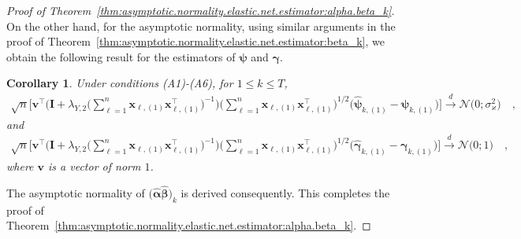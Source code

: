 \documentclass[
  12pt]{article}
\newtheorem{corollary}[thm]{Corollary}
\def\X{\mathbf{x}}
\begin{document}
\begin{proof}[Proof of Theorem~\ref{thm:asymptotic.normality.elastic.net.estimator:alpha.beta_k}]
	On the other hand, for the asymptotic normality, using similar arguments in the proof of Theorem~\ref{thm:asymptotic.normality.elastic.net.estimator:beta_k}, we obtain the following result for the estimators of $\bm{\psi}$ and $\bm{\gamma}$.
	\begin{corollary}  
		\label{thm:asymptotic.normality.elastic.net.estimator:theta_k}
		Under conditions \textrm{(A1)-(A6)}, for $1 \leq k \leq T$,  %
		\begin{align*}
			\sqrt{n}  \Big[   \mathbf{v}^{\top}  \Big( \mathbf{I} +  \lambda_{Y,2} \big( \sum_{\ell = 1}^{n}   \X_{\ell , (1)} \X_{\ell , (1)}^{\top} \big)^{-1}  \Big)  \Big(     \sum_{\ell = 1}^{n}    \X_{\ell , (1)} \X_{\ell , (1)}^{\top} \Big)^{1/2} \Big( \widehat{\bm{\psi}}   _{k,(1)} - \bm{\psi} _{k,(1)} \Big)   \Big]   
			\overset{ d }{\longrightarrow} \mathcal{N} \big( 0 ; \sigma_{\varkappa}^{2}  \big) \quad  , 
		\end{align*}   
		and 
		\begin{align*}
			\sqrt{n}  \Big[   \mathbf{v}^{\top}  \Big( \mathbf{I} + \lambda_{Y,2} \big( \sum_{\ell = 1}^{n}   \X_{\ell , (1)} \X_{\ell , (1)}^{\top} \big)^{-1}  \Big)  \Big(  \sum_{\ell = 1}^{n}    \X_{\ell , (1)} \X_{\ell , (1)}^{\top} \Big)^{1/2} \Big( \widehat{\bm{\gamma}}_{k,(1)} - \bm{\gamma}_{k,(1)} \Big)   \Big]   
			\overset{ d }{\longrightarrow} \mathcal{N} \big( 0 ; 1\big) \quad  , 
		\end{align*} 
		where $\mathbf{v}$ is a vector of norm $1$. 
	\end{corollary}   
	The asymptotic normality of $\big( \widehat{\bm{\alpha}} \widehat{\bm{\beta}} \big)_{k}$ is derived consequently. 
	This completes the proof of Theorem~\ref{thm:asymptotic.normality.elastic.net.estimator:alpha.beta_k}. 
\end{proof}
\end{document}
